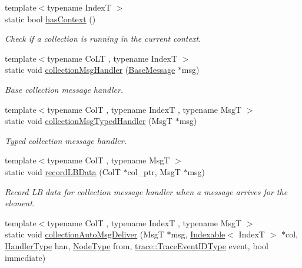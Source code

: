 \begin{DoxyCompactItemize}
{\footnotesize template$<$typename IndexT $>$ }\\static bool \hyperlink{structvt_1_1vrt_1_1collection_1_1_collection_manager_ad94808d98e429e50376a9d1b35de57ee}{has\+Context} ()
\begin{DoxyCompactList}\small\item\em Check if a collection is running in the current context. \end{DoxyCompactList}\item 
{\footnotesize template$<$typename Co\+LT , typename IndexT $>$ }\\static void \hyperlink{structvt_1_1vrt_1_1collection_1_1_collection_manager_a9b2bfe1f74298f0e9b7fdc4888f73e3d}{collection\+Msg\+Handler} (\hyperlink{namespacevt_ac34f95a5e2b8109b55bfba52b074443d}{Base\+Message} $\ast$msg)
\begin{DoxyCompactList}\small\item\em Base collection message handler. \end{DoxyCompactList}\item 
{\footnotesize template$<$typename ColT , typename IndexT , typename MsgT $>$ }\\static void \hyperlink{structvt_1_1vrt_1_1collection_1_1_collection_manager_a7bb443544c8c4b94a7a10a0ec8126018}{collection\+Msg\+Typed\+Handler} (MsgT $\ast$msg)
\begin{DoxyCompactList}\small\item\em Typed collection message handler. \end{DoxyCompactList}\item 
{\footnotesize template$<$typename ColT , typename MsgT $>$ }\\static void \hyperlink{structvt_1_1vrt_1_1collection_1_1_collection_manager_a530e4c24e204a0a97317e1245a09d54c}{record\+L\+B\+Data} (ColT $\ast$col\+\_\+ptr, MsgT $\ast$msg)
\begin{DoxyCompactList}\small\item\em Record LB data for collection message handler when a message arrives for the element. \end{DoxyCompactList}\item 
{\footnotesize template$<$typename ColT , typename IndexT , typename MsgT $>$ }\\static void \hyperlink{structvt_1_1vrt_1_1collection_1_1_collection_manager_af59dcd7ad91a77a8d7600469f214c42b}{collection\+Auto\+Msg\+Deliver} (MsgT $\ast$msg, \hyperlink{structvt_1_1vrt_1_1collection_1_1_indexable}{Indexable}$<$ IndexT $>$ $\ast$col, \hyperlink{namespacevt_af64846b57dfcaf104da3ef6967917573}{Handler\+Type} han, \hyperlink{namespacevt_a866da9d0efc19c0a1ce79e9e492f47e2}{Node\+Type} from, \hyperlink{namespacevt_1_1trace_a64a7185f3e102df8d8258f263ccd1582}{trace\+::\+Trace\+Event\+I\+D\+Type} event, bool immediate)

\end{DoxyCompactItemize}
